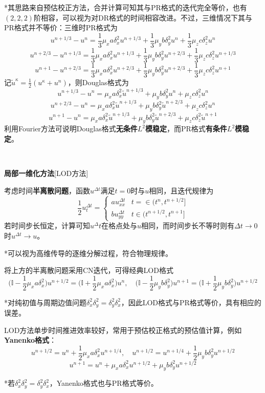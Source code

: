 \documentclass[a4paper,UTF8,fontset=windows]{ctexart}
\newcommand*{\bu}{\mathbf{u}}
\begin{document}
*其思路来自预估校正方法，合并计算可知其与PR格式的迭代完全等价，也有$(2,2,2)$阶相容，可以视为对DR格式的时间相容改进。不过，三维情况下其与PR格式并不等价：三维时PR格式为
$$u^{n+1/3}-u^n=\frac{1}{3}\mu_xa\delta_x^2u^{n+1/3}+\frac{1}{3}\mu_yb\delta_y^2u^n+\frac{1}{3}\mu_zc\delta_z^2u^n$$
$$u^{n+2/3}-u^{n+1/3}=\frac{1}{3}\mu_xa\delta_x^2u^{n+1/3}+\frac{1}{3}\mu_yb\delta_y^2u^{n+2/3}+\frac{1}{3}\mu_zc\delta_z^2u^{n+1/3}$$
$$u^{n+1}-u^{n+2/3}=\frac{1}{3}\mu_xa\delta_x^2u^{n+2/3}+\frac{1}{3}\mu_yb\delta_y^2u^{n+2/3}+\frac{1}{3}\mu_zc\delta_z^2u^{n+1}$$
记$\tilde{u}^\kappa=\frac{1}{2}(u^\kappa+u^n)$，则Douglas格式为
$$u^{n+1/3}-u^n=\mu_xa\delta_x^2\tilde{u}^{n+1/3}+\mu_yb\delta_y^2u^n+\mu_zc\delta_z^2u^n$$
$$u^{n+2/3}-u^n=\mu_xa\delta_x^2\tilde{u}^{n+1/3}+\mu_yb\delta_y^2\tilde{u}^{n+2/3}+\mu_zc\delta_z^2u^n$$
$$u^{n+1}-u^n=\mu_xa\delta_x^2\tilde{u}^{n+1/3}+\mu_yb\delta_y^2\tilde{u}^{n+2/3}+\mu_zc\delta_z^2\tilde{u}^{n+1}$$
利用Fourier方法可说明Douglas格式\textbf{无条件$L^2$模稳定}，而PR格式\textbf{有条件$L^2$模稳定}。

\

\textbf{局部一维化方法}[LOD方法]

考虑时间\textbf{半离散问题}，函数$u^{\Delta t}$满足$t=0$时与$u$相同，且迭代规律为
$$\frac{1}{2}u_t^{\Delta t}=\begin{cases}au_{xx}^{\Delta t}&t=\in(t^n,t^{n+1/2}]\\bu_{yy}^{\Delta t}&t\in(t^{n+1/2},t^{n+1}]\end{cases}$$
若时间步长恒定，计算可知$u^\Delta t$在格点处与$u$相同，而时间步长不等时则有$\Delta t\to0$时$u^{\Delta t}\to u$。

*可以视为高维传导的逐维分解过程，符合物理规律。

将上方的半离散问题采用CN迭代，可得经典LOD格式
$$\bigg(\mathbb{I}-\frac{1}{2}\mu_xa\delta_x^2\bigg)u^{n+1/2}=\bigg(\mathbb{I}+\frac{1}{2}\mu_xa\delta_x^2\bigg)u^n,\quad\bigg(\mathbb{I}-\frac{1}{2}\mu_yb\delta_y^2\bigg)u^{n+1}=\bigg(\mathbb{I}+\frac{1}{2}\mu_yb\delta_y^2\bigg)u^{n+1/2}$$

*对纯初值与周期边值问题$\delta_x^2\delta_y^2=\delta_y^2\delta_x^2$，因此LOD格式与PR格式等价，具有相应的误差。

LOD方法单步时间推进效率较好，常用于预估校正格式的预估值计算，例如\textbf{Yanenko格式}：
$$u^{n+1/2}=u^n+\frac{1}{2}\mu_xa\delta_x^2u^{n+1/4},\quad u^{n+1/2}=u^{n+1/4}+\frac{1}{2}\mu_yb\delta_y^2u^{n+1/2}$$
$$u^{n+1}=u^n+\mu_xa\delta_x^2u^{n+1/2}+\mu_yb\delta_y^2u^{n+1/2}$$

*若$\delta_x^2\delta_y^2=\delta_y^2\delta_x^2$，Yanenko格式也与PR格式等价。
\end{document}
